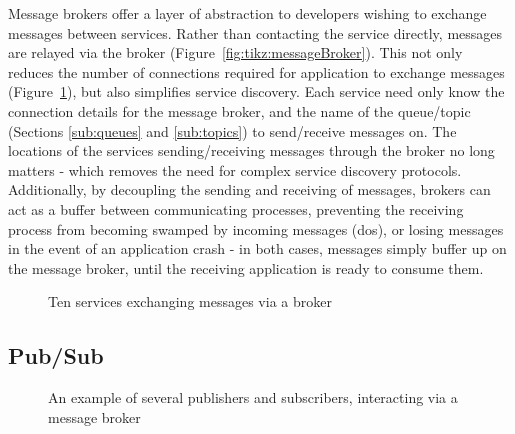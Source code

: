 Message brokers offer a layer of abstraction to developers wishing to exchange
messages between services. Rather than contacting the service directly, messages
are relayed via the broker (Figure~\ref{fig:tikz:messageBroker}). This not only
reduces the number of connections required for application to exchange messages
(Figure~\ref{fig:tikz:complexBrokerMessaging}), but also simplifies service
discovery. Each service need only know the connection details for the message
broker, and the name of the queue/topic (Sections \ref{sub:queues} and
\ref{sub:topics}) to send/receive messages on. The locations of the services
sending/receiving messages through the broker no long matters - which removes
the need for complex service discovery protocols. Additionally, by decoupling
the sending and receiving of messages, brokers can act as a buffer between
communicating processes, preventing the receiving process from becoming swamped
by incoming messages (\gls{dos}), or losing messages in the event of an
application crash - in both cases, messages simply buffer up on the message
broker, until the receiving application is ready to consume them.

\begin{figure}[htbp]
  \centering
  
  \caption{Ten services exchanging messages via a broker}
  \label{fig:tikz:complexBrokerMessaging}
\end{figure}

\subsection{Pub/Sub}
\label{sub:pubsub}

\begin{figure}[htbp]
  \centering
  
  \caption{An example of several publishers and subscribers, interacting via a
  message broker}
  \label{fig:tikz:queuesInsideBroker}
\end{figure}

